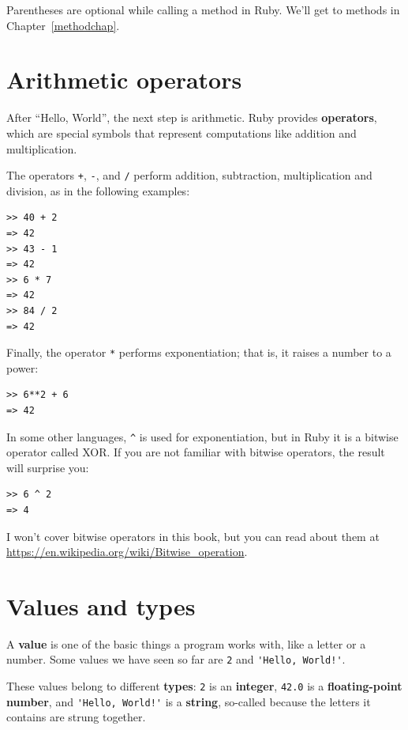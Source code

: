 \documentclass[10pt]{book}
\begin{document}
Parentheses are optional while calling a method in Ruby.  We'll get
to methods in Chapter~\ref{methodchap}.


\section{Arithmetic operators}

After ``Hello, World'', the next step is arithmetic.  Ruby provides
{\bf operators}, which are special symbols that represent computations
like addition and multiplication.  

The operators {\tt +}, {\tt -}, {\tt *} and {\tt /} perform addition,
subtraction, multiplication and division, as in the following examples:

\begin{verbatim}
>> 40 + 2
=> 42
>> 43 - 1
=> 42
>> 6 * 7
=> 42
>> 84 / 2
=> 42
\end{verbatim}
%

Finally, the operator {\tt **} performs exponentiation; that is,
it raises a number to a power:

\begin{verbatim}
>> 6**2 + 6
=> 42
\end{verbatim}
%
In some other languages, \verb"^" is used for exponentiation, but
in Ruby it is a bitwise operator called XOR.  If you are not
familiar with bitwise operators, the result will surprise you:

\begin{verbatim}
>> 6 ^ 2
=> 4
\end{verbatim}
%
I won't cover
bitwise operators in this book, but you can read about
them at \url{https://en.wikipedia.org/wiki/Bitwise_operation}.


\section{Values and types}

A {\bf value} is one of the basic things a program works with, like a
letter or a number.  Some values we have seen so far are {\tt 2}
and \verb"'Hello, World!'".

These values belong to different {\bf types}:
{\tt 2} is an {\bf integer}, {\tt 42.0} is a {\bf floating-point number},
and \verb"'Hello, World!'" is a {\bf string},
so-called because the letters it contains are strung together.
\end{document}
